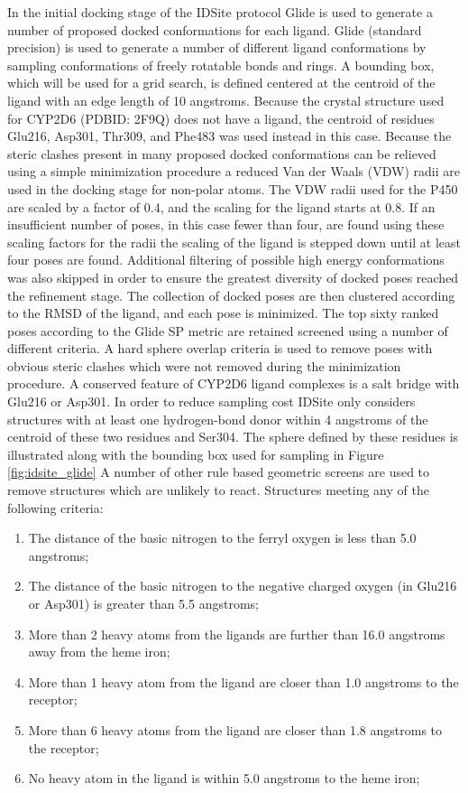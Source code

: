In the initial docking stage of the IDSite protocol Glide is used to generate a number of proposed docked conformations for each ligand.
Glide (standard precision) is used to generate a number of different ligand conformations by sampling conformations of freely rotatable bonds and rings.
A bounding box, which will be used for a grid search, is defined centered at the centroid of the ligand with an edge length of 10 angstroms.
Because the crystal structure used for CYP2D6 (PDBID: 2F9Q) does not have a ligand, the centroid of residues Glu216, Asp301, Thr309, and Phe483 was used instead in this case.
Because the steric clashes present in many proposed docked conformations can be relieved using a simple minimization procedure a reduced Van der Waals (VDW) radii are used in the docking stage for non-polar atoms.
The VDW radii used for the P450 are scaled by a factor of 0.4, and the scaling for the ligand starts at 0.8.
If an insufficient number of poses, in this case fewer than four, are found using these scaling factors for the radii the scaling of the ligand is stepped down until at least four poses are found.
Additional filtering of possible high energy conformations was also skipped in order to ensure the greatest diversity of docked poses reached the refinement stage.
The collection of docked poses are then clustered according to the RMSD of the ligand, and each pose is minimized.
The top sixty ranked poses according to the Glide SP metric are retained screened using a number of different criteria.
A hard sphere overlap criteria is used to remove poses with obvious steric clashes which were not removed during the minimization procedure.
A conserved feature of CYP2D6 ligand complexes is a salt bridge with Glu216 or Asp301.
In order to reduce sampling cost IDSite only considers structures with at least one hydrogen-bond donor within 4 angstroms of the centroid of these two residues and Ser304.
The sphere defined by these residues is illustrated along with the bounding box used for sampling in Figure \ref{fig:idsite_glide}
A number of other rule based geometric screens are used to remove structures which are unlikely to react.
Structures meeting any of the following criteria:
\begin{enumerate}
\item The distance of the basic nitrogen to the ferryl oxygen is less than 5.0 angstroms;
\item The distance of the basic nitrogen to the negative charged oxygen (in Glu216 or Asp301) is greater than 5.5 angstroms;
\item More than 2 heavy atoms from the ligands are further than 16.0 angstroms away from the heme iron;
\item More than 1 heavy atom from the ligand are closer than 1.0 angstroms to the receptor;
\item More than 6 heavy atoms from the ligand are closer than 1.8 angstroms to the receptor;
\item No heavy atom in the ligand is within 5.0 angstroms to the heme iron;
\end{enumerate}
